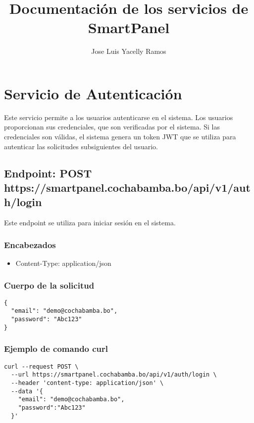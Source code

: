 \documentclass{article}
\title{Documentación de los servicios de SmartPanel}
\author{Jose Luis Yacelly Ramos }
\begin{document}
\maketitle
\tableofcontents

\newpage

\section{Servicio de Autenticación}

Este servicio permite a los usuarios autenticarse en el sistema. Los usuarios proporcionan sus credenciales, que son verificadas por el sistema. Si las credenciales son válidas, el sistema genera un token JWT que se utiliza para autenticar las solicitudes subsiguientes del usuario.

\subsection{Endpoint: POST https://smartpanel.cochabamba.bo/api/v1/auth/login}

Este endpoint se utiliza para iniciar sesión en el sistema.

\subsubsection{Encabezados}

\begin{itemize}
\item Content-Type: application/json
\end{itemize}

\subsubsection{Cuerpo de la solicitud}

\begin{verbatim}
{
  "email": "demo@cochabamba.bo",
  "password": "Abc123"
}
\end{verbatim}

\subsubsection{Ejemplo de comando curl}

\begin{verbatim}
curl --request POST \
  --url https://smartpanel.cochabamba.bo/api/v1/auth/login \
  --header 'content-type: application/json' \
  --data '{
    "email": "demo@cochabamba.bo",
    "password":"Abc123"
  }'
\end{verbatim}
\end{document}
